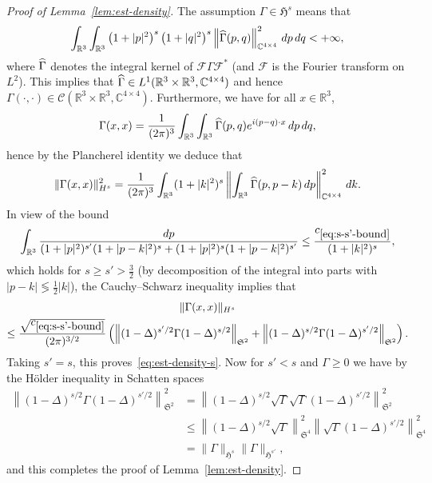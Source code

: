 \documentclass[10pt]{amsart}
\theoremstyle{definition}\newtheorem{defi}[theo]{Definition}\newtheorem{rema}[theo]{Remark}\newtheorem{exam}[theo]{Example}\newtheorem{exem}[theo]{Example}\newtheorem{nota}[theo]{Notation}
\newcommand{\cC}{\mathcal{C}}
\newcommand{\cF}{\mathcal{F}}
\newcommand\R{\mathbb{R}}
\newcommand\C{\mathbb{C}}
\renewcommand\hat{\widehat}
\newcommand{\gS}{\mathfrak{S}}
\newcommand{\gH}{\mathfrak{H}}
\newcommand\ii{{\ensuremath {\infty}}}
\let\oldhat\hat
\renewcommand*{\hat}[1]{\mathchoice{\widehat{#1}}{\widehat{#1}}{\oldhat{#1}}{\oldhat{#1}}}
\begin{document}
\begin{proof}[Proof of Lemma~\ref{lem:est-density}]
The assumption $\Gamma\in \gH^s$ means that
\[
\int_{\R^3}\int_{\R^3}\left(1+|p|^2\right)^s\left(1+|q|^2\right)^s\left\|\hat{\Gamma}(p,q)\right\|^2_{\C^{4\times 4}}\,dp\,dq<+\ii,
\]
where $\hat{\Gamma}$ denotes the integral kernel of $\cF\Gamma\cF^*$ (and $\cF$ is the Fourier transform on $L^2$). This implies that $\hat{\Gamma}\in L^1(\R^3\times\R^3, \C^{4\times 4})$ and hence $\Gamma(\cdot,\cdot)\in \cC(\R^3\times\R^3, \C^{4\times 4})$. Furthermore, we have for all $x\in\R^3$,
\[
\Gamma(x,x)=\frac{1}{(2\pi)^3}\int_{\R^3}\int_{\R^3}\hat{\Gamma}(p,q)e^{i(p-q)\cdot x}\,dp\,dq,
\]
hence by the Plancherel identity we deduce that
\[
\|\Gamma(x,x)\|_{H^s}^2 = \frac{1}{(2\pi)^3}\int_{\R^3} (1+|k|^2)^s \left\|\int_{\R^3}\hat{\Gamma}(p,p-k)\,dp\right\|^2_{\C^{4\times 4}}\,dk.
\]
In view of the bound
\begin{equation}\label{eq:s-s'-bound}
\int_{\R^3}\frac{dp}{(1+|p|^2)^{s'}(1+|p-k|^2)^s + (1+|p|^2)^s(1+|p-k|^2)^{s'}}\leq
\frac{c_{\eqref{eq:s-s'-bound}}}{(1+|k|^2)^s},
\end{equation}
which holds for $s\geq s'>\tfrac32$ (by decomposition of the integral into parts with $|p-k|\lessgtr\tfrac12 |k|$), the Cauchy--Schwarz inequality implies that
\begin{multline}
\|\Gamma(x,x)\|_{H^s}\\
\leq \frac{\sqrt{c_{\eqref{eq:s-s'-bound}}}}{(2\pi)^{3/2}}\left(\left\|(1-\Delta)^{s'/2}\Gamma(1-\Delta)^{s/2}\right\|_{\gS^2} + \left\|(1-\Delta)^{s/2}\Gamma(1-\Delta)^{s'/2}\right\|_{\gS^2}\right).
\end{multline}
Taking $s'=s$, this proves~\eqref{eq:est-density-s}. Now for $s'<s$ and $\Gamma\geq 0$ we have by the H\"older inequality in Schatten spaces
\begin{equation}\label{eq:Gamma-mixed-bound}
\begin{split}
\left\|(1-\Delta)^{s/2}\Gamma(1-\Delta)^{s'/2}\right\|_{\gS^2}^2 &= \left\|(1-\Delta)^{s/2}\sqrt{\Gamma}\sqrt{\Gamma}(1-\Delta)^{s'/2}\right\|_{\gS^2}^2\\
&\leq \left\|(1-\Delta)^{s/2}\sqrt{\Gamma}\right\|_{\gS^4}^2\left\|\sqrt{\Gamma}(1-\Delta)^{s'/2}\right\|_{\gS^4}^2\\
&= \|\Gamma\|_{\gH^s}\|\Gamma\|_{\gH^{s'}},
\end{split}
\end{equation}
and this completes the proof of Lemma~\ref{lem:est-density}.
\end{proof}
\end{document}
